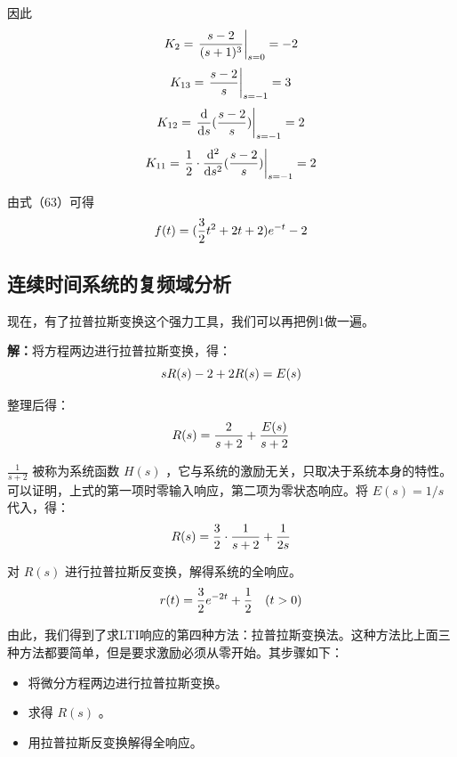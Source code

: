 \documentclass[UTF8,a4paper,11pt]{article}
\begin{document}
\begin{itemize}
因此
\begin{equation}
K_2=\left. \frac{s-2}{(s+1)^3} \right| _{s=0}=-2
\notag
\end{equation}
\begin{equation}
K_{13}=\left. \frac{s-2}{s} \right| _{s=-1}=3
\notag
\end{equation}
\begin{equation}
K_{12}=\left. \frac{ {\rm d}}{ {\rm d}s}(\frac{s-2}{s}) \right| _{s=-1}=2
\notag
\end{equation}
\begin{equation}
K_{11}=\left. \frac{1}{2}\cdot\frac{ {\rm d}^2}{ {\rm d}s^2}(\frac{s-2}{s}) \right| _{s=-1}=2
\notag
\end{equation}

由式（63）可得
\begin{equation}
f(t)=(\frac{3}{2}t^2+2t+2)e^{-t}-2
\notag
\end{equation}
\end{itemize}

\subsection{连续时间系统的复频域分析}
现在，有了拉普拉斯变换这个强力工具，我们可以再把例1做一遍。

\textbf{解：}将方程两边进行拉普拉斯变换，得：
\begin{equation}
sR(s)-2+2R(s)=E(s)
\notag
\end{equation}

整理后得：
\begin{equation}
R(s)=\frac{2}{s+2}+\frac{E(s)}{s+2}
\notag
\end{equation}

$\frac{1}{s+2}$ 被称为系统函数 $H(s)$ ，它与系统的激励无关，只取决于系统本身的特性。可以证明，上式的第一项时零输入响应，第二项为零状态响应。将 $E(s)=1/s$ 代入，得：
\begin{equation}
R(s)=\frac{3}{2}\cdot\frac{1}{s+2}+\frac{1}{2s}
\notag
\end{equation}

对 $R(s)$ 进行拉普拉斯反变换，解得系统的全响应。
\begin{equation}
r(t)=\frac{3}{2}e^{-2t}+\frac{1}{2}\quad(t>0)
\notag
\end{equation}

由此，我们得到了求LTI响应的第四种方法：拉普拉斯变换法。这种方法比上面三种方法都要简单，但是要求激励必须从零开始。其步骤如下：
\begin{itemize}
\item 将微分方程两边进行拉普拉斯变换。
\item 求得 $R(s)$ 。
\item 用拉普拉斯反变换解得全响应。
\end{itemize} 
\end{document}
